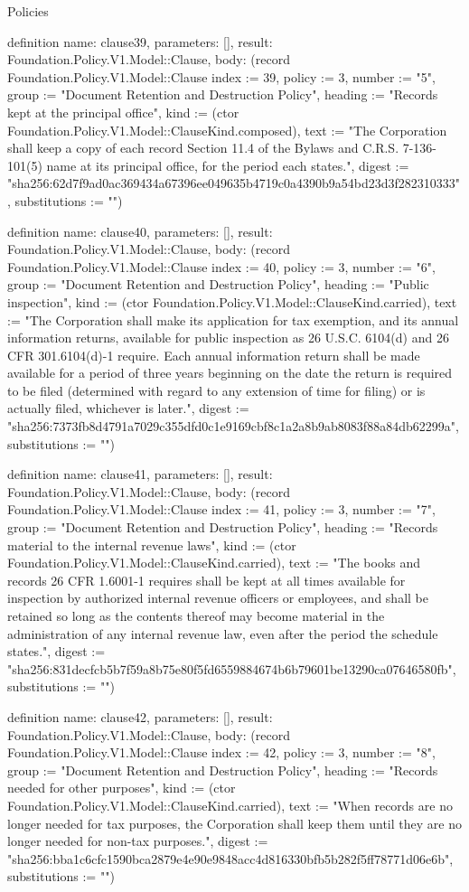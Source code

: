 \begin{lexlean}{Policies}
\begin{semanticmodule}
definition{
  name: clause39,
  parameters: [],
  result: Foundation.Policy.V1.Model::Clause,
  body: (record Foundation.Policy.V1.Model::Clause {index := 39, policy := 3, number := "5", group := "Document Retention and Destruction Policy", heading := "Records kept at the principal office", kind := (ctor Foundation.Policy.V1.Model::ClauseKind.composed), text := "The Corporation shall keep a copy of each record Section 11.4 of the Bylaws and C.R.S. 7-136-101(5) name at its principal office, for the period each states.", digest := "sha256:62d7f9ad0ac369434a67396ee049635b4719c0a4390b9a54bd23d3f282310333", substitutions := ""})
}

definition{
  name: clause40,
  parameters: [],
  result: Foundation.Policy.V1.Model::Clause,
  body: (record Foundation.Policy.V1.Model::Clause {index := 40, policy := 3, number := "6", group := "Document Retention and Destruction Policy", heading := "Public inspection", kind := (ctor Foundation.Policy.V1.Model::ClauseKind.carried), text := "The Corporation shall make its application for tax exemption, and its annual information returns, available for public inspection as 26 U.S.C. 6104(d) and 26 CFR 301.6104(d)-1 require. Each annual information return shall be made available for a period of three years beginning on the date the return is required to be filed (determined with regard to any extension of time for filing) or is actually filed, whichever is later.", digest := "sha256:7373fb8d4791a7029c355dfd0c1e9169cbf8c1a2a8b9ab8083f88a84db62299a", substitutions := ""})
}

definition{
  name: clause41,
  parameters: [],
  result: Foundation.Policy.V1.Model::Clause,
  body: (record Foundation.Policy.V1.Model::Clause {index := 41, policy := 3, number := "7", group := "Document Retention and Destruction Policy", heading := "Records material to the internal revenue laws", kind := (ctor Foundation.Policy.V1.Model::ClauseKind.carried), text := "The books and records 26 CFR 1.6001-1 requires shall be kept at all times available for inspection by authorized internal revenue officers or employees, and shall be retained so long as the contents thereof may become material in the administration of any internal revenue law, even after the period the schedule states.", digest := "sha256:831decfcb5b7f59a8b75e80f5fd6559884674b6b79601be13290ca07646580fb", substitutions := ""})
}

definition{
  name: clause42,
  parameters: [],
  result: Foundation.Policy.V1.Model::Clause,
  body: (record Foundation.Policy.V1.Model::Clause {index := 42, policy := 3, number := "8", group := "Document Retention and Destruction Policy", heading := "Records needed for other purposes", kind := (ctor Foundation.Policy.V1.Model::ClauseKind.carried), text := "When records are no longer needed for tax purposes, the Corporation shall keep them until they are no longer needed for non-tax purposes.", digest := "sha256:bba1c6cfc1590bca2879e4e90e9848acc4d816330bfb5b282f5ff78771d06e6b", substitutions := ""})
}


\end{semanticmodule}
\end{lexlean}
